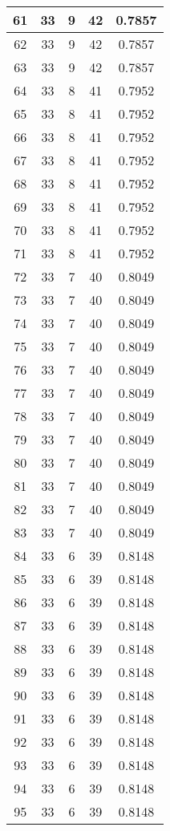\documentclass[letterpaper, 12pt]{article}
\begin{document}
\begin{longtable}{|c|c|c|c|c|}
\hline
61 & 33 & 9 & 42 & 0.7857 \\
\hline
62 & 33 & 9 & 42 & 0.7857 \\
\hline
63 & 33 & 9 & 42 & 0.7857 \\
\hline
64 & 33 & 8 & 41 & 0.7952 \\
\hline
65 & 33 & 8 & 41 & 0.7952 \\
\hline
66 & 33 & 8 & 41 & 0.7952 \\
\hline
67 & 33 & 8 & 41 & 0.7952 \\
\hline
68 & 33 & 8 & 41 & 0.7952 \\
\hline
69 & 33 & 8 & 41 & 0.7952 \\
\hline
70 & 33 & 8 & 41 & 0.7952 \\
\hline
71 & 33 & 8 & 41 & 0.7952 \\
\hline
72 & 33 & 7 & 40 & 0.8049 \\
\hline
73 & 33 & 7 & 40 & 0.8049 \\
\hline
74 & 33 & 7 & 40 & 0.8049 \\
\hline
75 & 33 & 7 & 40 & 0.8049 \\
\hline
76 & 33 & 7 & 40 & 0.8049 \\
\hline
77 & 33 & 7 & 40 & 0.8049 \\
\hline
78 & 33 & 7 & 40 & 0.8049 \\
\hline
79 & 33 & 7 & 40 & 0.8049 \\
\hline
80 & 33 & 7 & 40 & 0.8049 \\
\hline
81 & 33 & 7 & 40 & 0.8049 \\
\hline
82 & 33 & 7 & 40 & 0.8049 \\
\hline
83 & 33 & 7 & 40 & 0.8049 \\
\hline
84 & 33 & 6 & 39 & 0.8148 \\
\hline
85 & 33 & 6 & 39 & 0.8148 \\
\hline
86 & 33 & 6 & 39 & 0.8148 \\
\hline
87 & 33 & 6 & 39 & 0.8148 \\
\hline
88 & 33 & 6 & 39 & 0.8148 \\
\hline
89 & 33 & 6 & 39 & 0.8148 \\
\hline
90 & 33 & 6 & 39 & 0.8148 \\
\hline
91 & 33 & 6 & 39 & 0.8148 \\
\hline
92 & 33 & 6 & 39 & 0.8148 \\
\hline
93 & 33 & 6 & 39 & 0.8148 \\
\hline
94 & 33 & 6 & 39 & 0.8148 \\
\hline
95 & 33 & 6 & 39 & 0.8148 \\

\end{longtable}
\end{document}
